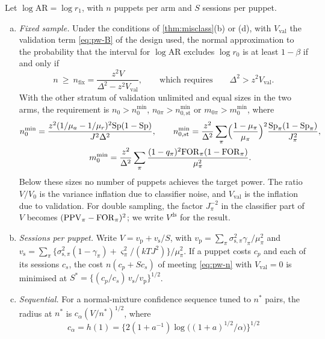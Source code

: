 \begin{proposition}\label{prop:power}
Let $\log\mathrm{AR}=\log r_1$, with $n$ puppets per arm and $S$ sessions per puppet.
\begin{enumerate}[(a)]
  \item \emph{Fixed sample.} Under the conditions of \cref{thm:misclass}(b) or (d), with $V_{\mathrm{val}}$ the validation term \eqref{eq:pw-B} of the design used, the normal approximation to the probability that the interval for $\log\mathrm{AR}$ excludes $\log r_0$ is at least $1-\beta$ if and only if
  \begin{equation}\label{eq:pw-n}
    n\ \ge\ n_{\mathrm{fix}}=\frac{z^2V}{\Delta^2-z^2V_{\mathrm{val}}},\qquad\text{which requires}\qquad \Delta^2>z^2V_{\mathrm{val}}.
  \end{equation}
  With the other stratum of validation unlimited and equal sizes in the two arms, the requirement is $n_0>n_0^{\min}$, $n_{0\pi}>n_{0,\mathrm{st}}^{\min}$ or $m_{0\pi}>m_0^{\min}$, where
  \begin{gather*}
    n_0^{\min}=\frac{z^2(1/\mu_a-1/\mu_r)^2\mathrm{Sp}(1-\mathrm{Sp})}{J^2\Delta^2},\qquad
    n_{0,\mathrm{st}}^{\min}=\frac{z^2}{\Delta^2}\sum_\pi\Bigl(\frac{1-\mu_\pi}{\mu_\pi}\Bigr)^2\frac{\mathrm{Sp}_\pi(1-\mathrm{Sp}_\pi)}{J_\pi^2},\\
    m_0^{\min}=\frac{z^2}{\Delta^2}\sum_\pi\frac{(1-q_\pi)^2\mathrm{FOR}_\pi(1-\mathrm{FOR}_\pi)}{\mu_\pi^2}.
  \end{gather*}
  Below these sizes no number of puppets achieves the target power. The ratio $V/V_0$ is the variance inflation due to classifier noise, and $V_{\mathrm{val}}$ is the inflation due to validation. For double sampling, the factor $J_\pi^{-2}$ in the classifier part of $V$ becomes $(\mathrm{PPV}_\pi-\mathrm{FOR}_\pi)^2$; we write $V^{\mathrm{ds}}$ for the result.
  \item \emph{Sessions per puppet.} Write $V=v_{\mathrm p}+v_{\mathrm s}/S$, with $v_{\mathrm p}=\sum_\pi\sigma^2_{\mathrm s,\pi}\gamma_\pi/\mu_\pi^2$ and $v_{\mathrm s}=\sum_\pi\{\sigma^2_{\mathrm s,\pi}(1-\gamma_\pi)+\varsigma^2_\pi/(kTJ^2)\}/\mu_\pi^2$. If a puppet costs $c_p$ and each of its sessions $c_s$, the cost $n(c_p+Sc_s)$ of meeting \eqref{eq:pw-n} with $V_{\mathrm{val}}=0$ is minimised at $S^\ast=\{(c_p/c_s)\,v_{\mathrm s}/v_{\mathrm p}\}^{1/2}$.
  \item \emph{Sequential.} For a normal-mixture confidence sequence tuned to $n^\ast$ pairs, the radius at $n^\ast$ is $c_\alpha(V/n^\ast)^{1/2}$, where
  \[
    c_\alpha=h(1)=\bigl\{2(1+a^{-1})\log\bigl((1+a)^{1/2}/\alpha\bigr)\bigr\}^{1/2}
\]
\end{enumerate}
\end{proposition}

